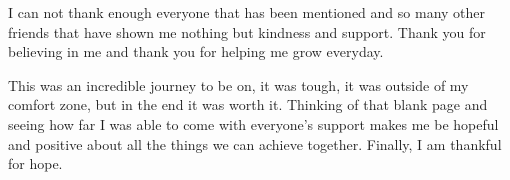 \begin{ntacknowledgements}
I can not thank enough everyone that has been mentioned and so many other friends that have shown me nothing but kindness and support. Thank you for believing in me and thank you for helping me grow everyday.

This was an incredible journey to be on, it was tough, it was outside of my comfort zone, but in the end it was worth it. Thinking of that blank page and seeing how far I was able to come with everyone's support makes me be hopeful and positive about all the things we can achieve together. Finally, I am thankful for hope.
\end{ntacknowledgements}